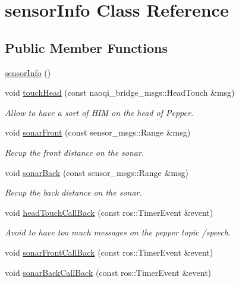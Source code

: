 \hypertarget{classsensor_info}{}\section{sensor\+Info Class Reference}
\label{classsensor_info}
\subsection*{Public Member Functions}
\begin{DoxyCompactItemize}
\item 
\hyperlink{classsensor_info_a9a78f793919453ef7062a4be8dfc6693}{sensor\+Info} ()
\item 
void \hyperlink{classsensor_info_a3c05bf886c30bd9a58c267deac8a41c6}{touch\+Head} (const naoqi\+\_\+bridge\+\_\+msgs\+::\+Head\+Touch \&msg)
\begin{DoxyCompactList}\small\item\em Allow to have a sort of H\+IM on the head of Pepper. \end{DoxyCompactList}\item 
void \hyperlink{classsensor_info_a387ea702718ef6c83c4b8d34135d69dd}{sonar\+Front} (const sensor\+\_\+msgs\+::\+Range \&msg)
\begin{DoxyCompactList}\small\item\em Recup the front distance on the sonar. \end{DoxyCompactList}\item 
void \hyperlink{classsensor_info_aaa624fac38ad4a88acfa66f21a223238}{sonar\+Back} (const sensor\+\_\+msgs\+::\+Range \&msg)
\begin{DoxyCompactList}\small\item\em Recup the back distance on the sonar. \end{DoxyCompactList}\item 
void \hyperlink{classsensor_info_a0d8c9bb41d21a8d89330bd14fce5a6a2}{head\+Touch\+Call\+Back} (const ros\+::\+Timer\+Event \&event)
\begin{DoxyCompactList}\small\item\em Avoid to have too much messages on the pepper topic /speech. \end{DoxyCompactList}\item 
void \hyperlink{classsensor_info_a0a465025f366c28cce5d69da969e40e1}{sonar\+Front\+Call\+Back} (const ros\+::\+Timer\+Event \&event)
\item 
void \hyperlink{classsensor_info_a4f399406a35121ae1172d341e84c2531}{sonar\+Back\+Call\+Back} (const ros\+::\+Timer\+Event \&event)
\end{DoxyCompactItemize}


